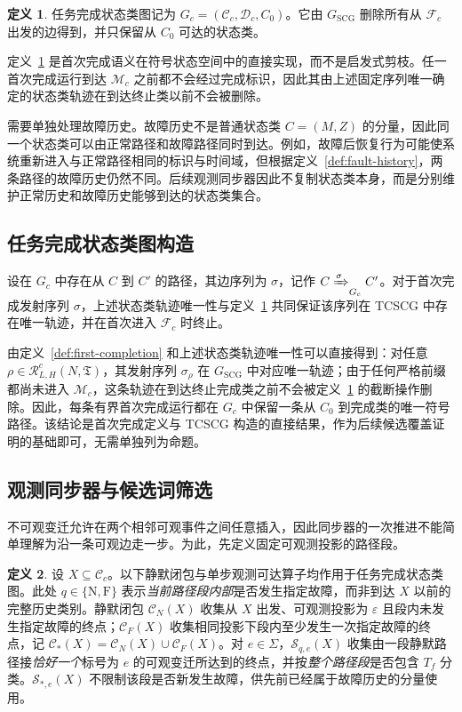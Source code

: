 \documentclass[master,fontset=ubuntu]{shnuthesis}
\theoremstyle{definition}
\newtheorem{thesisdefinition}{定义}
\begin{document}
\begin{thesisdefinition}
\label{def:tcscg}
任务完成状态类图记为 \(G_c=(\mathcal C_c,\mathcal D_c,C_0)\)。它由 \(G_{\mathrm{SCG}}\) 删除所有从 \(\mathcal F_c\) 出发的边得到，并只保留从 \(C_0\) 可达的状态类。
\end{thesisdefinition}

定义~\ref{def:tcscg} 是首次完成语义在符号状态空间中的直接实现，而不是启发式剪枝。任一首次完成运行到达 \(\mathcal M_c\) 之前都不会经过完成标识，因此其由上述固定序列唯一确定的状态类轨迹在到达终止类以前不会被删除。

需要单独处理故障历史。故障历史不是普通状态类 \(C=(M,Z)\) 的分量，因此同一个状态类可以由正常路径和故障路径同时到达。例如，故障后恢复行为可能使系统重新进入与正常路径相同的标识与时间域，但根据定义~\ref{def:fault-history}，两条路径的故障历史仍然不同。后续观测同步器因此不复制状态类本身，而是分别维护正常历史和故障历史能够到达的状态类集合。

\subsection{任务完成状态类图构造}

设在 \(G_c\) 中存在从 \(C\) 到 \(C'\) 的路径，其边序列为 \(\sigma\)，记作 \(C\xRightarrow{\sigma}_{G_c}C'\)。对于首次完成发射序列 \(\sigma\)，上述状态类轨迹唯一性与定义~\ref{def:tcscg} 共同保证该序列在 TCSCG 中存在唯一轨迹，并在首次进入 \(\mathcal F_c\) 时终止。

由定义~\ref{def:first-completion} 和上述状态类轨迹唯一性可以直接得到：对任意 \(\rho\in\mathcal R^c_{L,H}(N,\mathfrak T)\)，其发射序列 \(\sigma_\rho\) 在 \(G_{\mathrm{SCG}}\) 中对应唯一轨迹；由于任何严格前缀都尚未进入 \(\mathcal M_c\)，这条轨迹在到达终止完成类之前不会被定义~\ref{def:tcscg} 的截断操作删除。因此，每条有界首次完成运行都在 \(G_c\) 中保留一条从 \(C_0\) 到完成类的唯一符号路径。该结论是首次完成定义与 TCSCG 构造的直接结果，作为后续候选覆盖证明的基础即可，无需单独列为命题。

\subsection{观测同步器与候选词筛选}

不可观变迁允许在两个相邻可观事件之间任意插入，因此同步器的一次推进不能简单理解为沿一条可观边走一步。为此，先定义固定可观测投影的路径段。

\begin{thesisdefinition}
\label{def:segment-reachability}
设 \(X\subseteq\mathcal C_c\)。以下静默闭包与单步观测可达算子均作用于任务完成状态类图。此处 \(q\in\{\mathrm N,\mathrm F\}\) 表示\emph{当前路径段内部}是否发生指定故障，而非到达 \(X\) 以前的完整历史类别。静默闭包 \(\mathscr C_N(X)\) 收集从 \(X\) 出发、可观测投影为 \(\varepsilon\) 且段内未发生指定故障的终点；\(\mathscr C_F(X)\) 收集相同投影下段内至少发生一次指定故障的终点，记 \(\mathscr C_\ast(X)=\mathscr C_N(X)\cup\mathscr C_F(X)\)。对 \(e\in\Sigma\)，\(\mathscr S_{q,e}(X)\) 收集由一段静默路径接\emph{恰好一个}标号为 \(e\) 的可观变迁所达到的终点，并按\emph{整个路径段}是否包含 \(T_f\) 分类。\(\mathscr S_{\ast,e}(X)\) 不限制该段是否新发生故障，供先前已经属于故障历史的分量使用。
\end{thesisdefinition}
\end{document}
